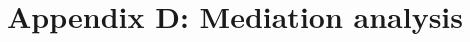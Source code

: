 \documentclass[9pt,twocolumn,twoside]{gsajnl}
\begin{document}




\section{Appendix D: Mediation analysis}
\end{document}
